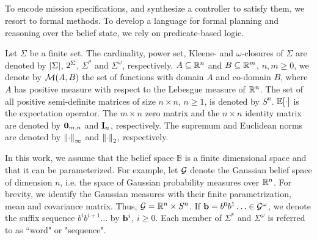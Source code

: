 \documentclass[conference]{IEEEtran}
\begin{document}
	\subsection{\DTL}\label{sec:DTL}
    To encode mission specifications, and synthesize a controller to satisfy them, we resort to formal methods. To develop a language for formal planning and reasoning over the belief state, we rely on predicate-based logic.
    
    
    Let $\Sigma$ be a finite set. The cardinality,
    power set, Kleene- and $\omega$-closures
    of $\Sigma$ are denoted by $\left| {\Sigma} \right|$,
    $2^{\Sigma}$, $\Sigma^*$ and $\Sigma^\omega$,
    respectively.
    $A \subseteq \mathbb{R}^n$ and $B \subseteq \mathbb{R}^m$,
    $n, m \geq 0$, we denote by $\mathcal{M}(A, B)$ the set of
    functions with domain $A$ and co-domain $B$, where $A$ has positive measure with
    respect to the Lebesgue measure of $\mathbb{R}^n$.
    The set of all positive semi-definite matrices of size
    $n \times n$, $n \geq 1$, is denoted by $S^n$.
    $\mathbb{E}[\cdot]$ is the expectation operator.
    The $m \times n$ zero matrix and
    the $n \times n$ identity matrix are denoted by
    $\mathbf{0}_{m, n}$ and $\mathbf{I}_n$, respectively.
    The supremum and Euclidean norms are denoted by
    $\left\| {\cdot} \right\|_{\infty}$ and $\left\| {\cdot} \right\|_{2}$, respectively.
    
    In this work, we assume that the belief space $\mathbb{B}$ is  a finite dimensional space and that it can be parameterized. For example, let $\mathcal{G}$ denote the Gaussian belief space
    of dimension $n$, i.e. the space of Gaussian
    probability measures over $\mathbb{R}^n$.
    For brevity, we identify the Gaussian measures
    with their finite parametrization, mean and
    covariance matrix. Thus,
    $\mathcal{G} =  \mathbb{R}^n \times  S^n$.
    If $\mathbf{b} = b^0b^1 \ldots \in \mathcal{G}^{\omega}$,
    we denote the suffix sequence $b^i b^{i+1} \ldots$ by
    $\mathbf{b}^i$, $i \geq 0$. Each member of $\Sigma^*$ and $\Sigma^\omega$ is referred to as ``word" or "sequence". 
    
\end{document}

